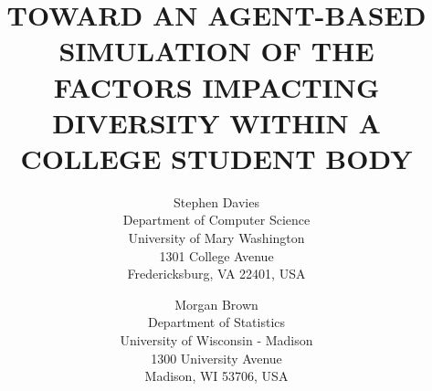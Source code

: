 \documentclass{wscpaperproc}
\begin{document}

\title{TOWARD AN AGENT-BASED SIMULATION OF THE FACTORS IMPACTING \\DIVERSITY
WITHIN A COLLEGE STUDENT BODY}

\author{Stephen Davies\\ [12pt]
Department of Computer Science \\
University of Mary Washington\\
1301 College Avenue \\
Fredericksburg, VA 22401, USA
\and
Morgan Brown\\[12pt]
Department of Statistics \\
University of Wisconsin - Madison\\
1300 University Avenue\\
Madison, WI 53706, USA \\
}

\maketitle









\appendix

\vspace{6pt}





\end{document}
